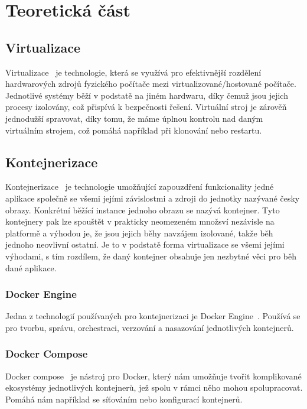﻿\chapter{Teoretická část}


\section{Virtualizace}
Virtualizace~\autocite{virtualizace-Martin-Polednik} je technologie, která se využívá pro efektivnější rozdělení hardwarových zdrojů fyzického počítače mezi virtualizované/hostované počítače.
Jednotlivé systémy běží v podstatě na jiném hardwaru, díky čemuž jsou jejich procesy izolovány, což přispívá k bezpečnosti řešení.
Virtuální stroj je zárověň jednodužší spravovat, díky tomu, že máme úplnou kontrolu nad daným virtuálním strojem, což pomáhá například při klonování nebo restartu.


\section{Kontejnerizace}
Kontejnerizace~\autocite{virtualizace-Martin-Polednik} je technologie umožňující zapouzdření funkcionality jedné aplikace společně se všemi jejími závislostmi a zdroji do jednotky nazývané česky obrazy.
Konkrétní běžící instance jednoho obrazu se nazývá kontejner.
Tyto kontejnery pak lze spouštět v prakticky neomezeném množsví nezávisle na platformě a výhodou je, že jsou jejich běhy navzájem izolované, takže běh jednoho neovlivní ostatní.
Je to v podstatě forma virtualizace se všemi jejími výhodami, s tím rozdílem, že daný kontejner obsahuje jen nezbytné věci pro běh dané aplikace.

\subsection{Docker Engine}
Jedna z technologií používaných pro kontejnerizaci je Docker Engine~\autocite{kontejnerizace-docker}.
Používá se pro tvorbu, správu, orchestraci, verzování a nasazování jednotlivých kontejnerů.

\subsection{Docker Compose}
Docker compose~\autocite{kontejnerizace-docker-compose} je nástroj pro Docker, který nám umožňuje tvořit komplikované ekosystémy jednotlivých kontejnerů, jež spolu v rámci něho mohou spolupracovat.
Pomáhá nám například se síťováním nebo konfigurací kontejnerů.


